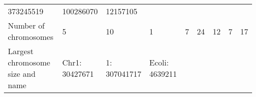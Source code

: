 \documentclass[]{article}
\begin{document}
\begin{longtable}[]{@{}lllllllll@{}}
\begin{minipage}[t]{0.07\columnwidth}
373245519\strut
\end{minipage} & \begin{minipage}[t]{0.07\columnwidth}\raggedright\strut
100286070\strut
\end{minipage} & \begin{minipage}[t]{0.07\columnwidth}\raggedright\strut
12157105\strut
\end{minipage}\tabularnewline
\begin{minipage}[t]{0.16\columnwidth}\raggedright\strut
Number of chromosomes\strut
\end{minipage} & \begin{minipage}[t]{0.07\columnwidth}\raggedright\strut
5\strut
\end{minipage} & \begin{minipage}[t]{0.07\columnwidth}\raggedright\strut
10\strut
\end{minipage} & \begin{minipage}[t]{0.07\columnwidth}\raggedright\strut
1\strut
\end{minipage} & \begin{minipage}[t]{0.08\columnwidth}\raggedright\strut
7\strut
\end{minipage} & \begin{minipage}[t]{0.08\columnwidth}\raggedright\strut
24\strut
\end{minipage} & \begin{minipage}[t]{0.07\columnwidth}\raggedright\strut
12\strut
\end{minipage} & \begin{minipage}[t]{0.07\columnwidth}\raggedright\strut
7\strut
\end{minipage} & \begin{minipage}[t]{0.07\columnwidth}\raggedright\strut
17\strut
\end{minipage}\tabularnewline
\begin{minipage}[t]{0.16\columnwidth}\raggedright\strut
Largest chromosome size and name\strut
\end{minipage} & \begin{minipage}[t]{0.07\columnwidth}\raggedright\strut
Chr1: 30427671\strut
\end{minipage} & \begin{minipage}[t]{0.07\columnwidth}\raggedright\strut
1: 307041717\strut
\end{minipage} & \begin{minipage}[t]{0.07\columnwidth}\raggedright\strut
Ecoli: 4639211\strut
\end{minipage} & \begin{minipage}[t]{0.08\columnwidth}\raggedright\strut

\end{minipage}
\end{longtable}
\end{document}
